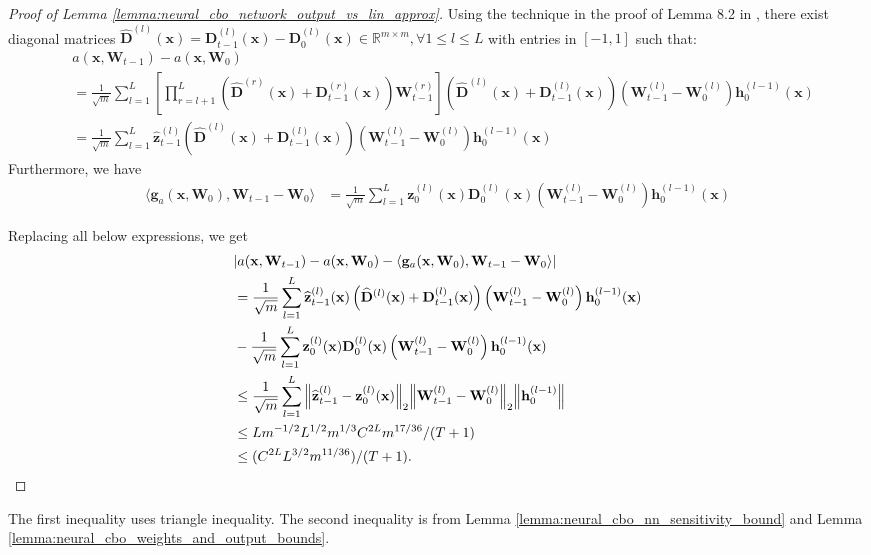 \begin{proof}[Proof of Lemma \ref{lemma:neural_cbo_network_output_vs_lin_approx}]
Using the technique in the proof of Lemma 8.2 in \citep{allen2019convergence},  there exist diagonal matrices $\widehat{\mathbf{D}}^{(l)} (\mathbf{x}) = \mathbf{D}_{t-1}^{(l)}(\mathbf{x}) - \mathbf{D}_{0}^{(l)}(\mathbf{x})   \in \mathbb{R}^{m \times m}, \forall 1\le l \le L$ with entries in
$[-1,1]$ such that:
\begin{align*}
    &  a(\mathbf{x}, \mathbf{W}_{t-1}) - a(\mathbf{x}, \mathbf{W}_{0}) 
    \\
    & = \frac{1}{\sqrt{m}} \sum_{l=1}^L \left [ \prod_{r = l+1}^L \left(\widehat{\mathbf{D}}^{(r)} (\mathbf{x}) + \mathbf{D}_{t-1}^{(r)} (\mathbf{x}) \right) \mathbf{W}_{t-1}^{(r)} \right] \left (\widehat{\mathbf{D}}^{(l)} (\mathbf{x}) + \mathbf{D}_{t-1}^{(l)} (\mathbf{x}) \right) (\mathbf{W}_{t-1}^{(l)} - \mathbf{W}_{0}^{(l)}) \mathbf{h}_{0}^{(l-1)} (\mathbf{x})
    \\
    & = \frac{1}{\sqrt{m}} \sum_{l=1}^L  \widehat{\mathbf{z}}_{t-1}^{(l)} \left (\widehat{\mathbf{D}}^{(l)} (\mathbf{x}) + \mathbf{D}_{t-1}^{(l)} (\mathbf{x}) \right) \left( \mathbf{W}_{t-1}^{(l)} - \mathbf{W}_{0}^{(l)} \right) \mathbf{h}_{0}^{(l-1)} (\mathbf{x})
\end{align*}
Furthermore, we have 
\begin{align*}
    \langle \mathbf{g}_{a}(\mathbf{x}, \mathbf{W}_0), \mathbf{W}_{t-1} - \mathbf{W}_0 \rangle &= \frac{1}{\sqrt{m}}\sum_{l=1}^L  \mathbf{z}_0^{(l)}(\mathbf{x}) \mathbf{D}_0^{(l)}(\mathbf{x}) \left(\mathbf{W}_{t-1}^{(l)} -  \mathbf{W}_0^{(l)}\right) \mathbf{h}_0^{(l-1)}(\mathbf{x}) 
\end{align*}

Replacing all below expressions, we get
\begin{align*}
    & \lvert a(\mathbf{x}, \mathbf{W}_{t-1}) -  a(\mathbf{x}, \mathbf{W}_{0}) - \langle \mathbf{g}_{a}(\mathbf{x}, \mathbf{W}_0), \mathbf{W}_{t-1} - \mathbf{W}_0 \rangle \rvert 
    \\
    & = \frac{1}{\sqrt{m}} \sum_{l=1}^L  \widehat{\mathbf{z}}_{t-1}^{(l)} (\mathbf{x}) \left (\widehat{\mathbf{D}}^{(l)} (\mathbf{x}) + \mathbf{D}_{t-1}^{(l)} (\mathbf{x}) \right) \left( \mathbf{W}_{t-1}^{(l)} - \mathbf{W}_{0}^{(l)} \right) \mathbf{h}_{0}^{(l-1)} (\mathbf{x})
    \\ 
    & - \frac{1}{\sqrt{m}}\sum_{l=1}^L  \mathbf{z}_0^{(l)}(\mathbf{x}) \mathbf{D}_0^{(l)}(\mathbf{x}) \left(\mathbf{W}_{t-1}^{(l)} -  \mathbf{W}_0^{(l)}\right) \mathbf{h}_0^{(l-1)}(\mathbf{x})
    \\
    & \le \frac{1}{\sqrt{m}}\sum_{l=1}^L \norm{\widehat{\mathbf{z}}_{t-1}^{(l)} - \mathbf{z}_0^{(l)}(\mathbf{x})}_2  \norm{\mathbf{W}_{t-1}^{(l)} -  \mathbf{W}_0^{(l)}}_2 \norm{\mathbf{h}_{0}^{(l-1)}}
    \\
    & \le L m^{-1/2} L^{1/2} m^{1/3} C^{2L} m^{17/36} / (T+1)
    \\ 
    & \le (C^{2L} L^{3/2} m^{11/36}) / (T+1).
\end{align*} 
\end{proof}
The first inequality uses triangle inequality. The second inequality is from Lemma \ref{lemma:neural_cbo_nn_sensitivity_bound} and Lemma  \ref{lemma:neural_cbo_weights_and_output_bounds}.

